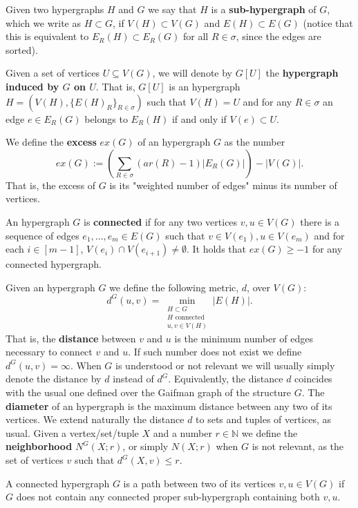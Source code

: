 \documentclass[12pt,notitlepage,a4paper]{article}
\theoremstyle{definition}
\newcommand{\N}{\mathbb{N}}
\begin{document}
Given two hypergraphs $H$ and $G$ we say that $H$
is a \textbf{sub-hypergraph} of $G$, which we write as $H\subset G$,
if $V(H)\subset V(G)$ and $E(H)\subset E(G)$ (notice 
that this is equivalent to $E_R(H)\subset E_R(G)$ for all
$R\in \sigma$, since the edges are sorted).\par


Given a set of vertices $U\subseteq V(G)$, 
we will denote by $G[U]$ the \textbf{hypergraph induced
by $G$ on $U$}. That is, $G[U]$ is an hypergraph
$H=(V(H),\{E(H)_R\}_{R\in \sigma})$ such that 
$V(H)=U$ and for any $R\in \sigma$ 
an edge $e\in E_R(G)$ belongs 
to $E_R(H)$ if and only if $V(e)\subset U$.
\par



We define the \textbf{excess} $ex(G)$ of an hypergraph $G$ as the number
\[
ex(G):= \left(\sum_{R\in \sigma} (ar(R)-1)|E_R(G)|\right) - |V(G)|.  
\] 
That is, the excess of $G$ is its "weighted number of edges"
minus its number of vertices. \par
An hypergraph $G$ is \textbf{connected} if for any two vertices $v,u\in V(G)$
there is a sequence of edges $e_1,\dots, e_m\in E(G)$ such that
$v\in V(e_1), u\in V(e_m)$ and for each $i\in [m-1]$, 
$V(e_i)\cap V(e_{i+1})\neq \emptyset$. It holds that
$ex(G)\geq -1$ for any connected hypergraph.
\par
Given an hypergraph $G$ we define the following metric, $d$, over $V(G)$:
\[ d^G(u,v)= \min_{\substack{H \subset G\\ 
		H \text{ connected }\\
		u,v\in V(H)}} |E(H)| .\]
That is, the \textbf{distance} between $v$ and $u$ is the minimum number of
edges necessary to connect $v$ and $u$. 
If such number does not exist we define $d^G(u,v)=\infty$. 
When $G$ 
is understood or not relevant we will usually simply denote the 
distance by $d$ instead of $d^G$. Equivalently, the distance $d$
coincides with the usual one defined over the Gaifman graph of the structure 
$G$. The \textbf{diameter} of an hypergraph is the maximum distance between any 
two of its vertices. 
We extend naturally the distance $d$ to sets and tuples of
vertices, as usual. Given a vertex/set/tuple $X$ and a number
$r\in \N$ we define the \textbf{neighborhood}
$N^G(X;r)$, or simply $N(X;r)$ when $G$ is not relevant,
as the set of vertices $v$ such that $d^G(X,v)\leq r$.
\par
A connected hypergraph $G$ is a path between two of its 
vertices $v,u\in V(G)$ if $G$ 
does not contain any connected proper sub-hypergraph containing both $v,u$.
\end{document}
